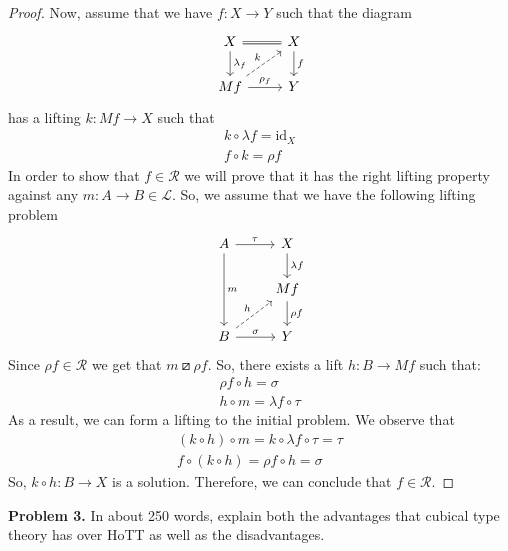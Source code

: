 \documentclass{article}
\theoremstyle{definition}
\newcommand{\comp}{\mathbin{\circ}}
\newcommand{\idarrow}[1][]{\mathrm{id}_{#1}}
\begin{document}
\begin{proof}
Now, assume that we have $f : X \to Y$
such that the diagram
\[
 \begin{tikzcd}
    X \ar[r,equal] \ar[d,"\lambda_f"] & X \ar[d,"f"] \\
    Mf \ar[r,"\rho_f"] \ar[ur, dashed, "k"] & Y
 \end{tikzcd}
\]
has a lifting $k : M f \to X$ such that
\begin{align*}
 k \comp \lambda f = \idarrow[X] \\
 f \comp k = \rho f
\end{align*}
In order to show that $f \in \mathcal{R}$
we will prove that it has the right lifting
property against any $m : A \to B \in \mathcal{L}$.
So, we assume that we have the following
lifting problem
\[
 \begin{tikzcd}
  A \ar[dd, "m"] \rar["\tau"] & X \dar["\lambda f"] \\
  & Mf \dar["\rho f"] \\
  B \rar["\sigma"] \ar[ur, dashed, "h"] & Y
 \end{tikzcd}
\]
Since $\rho f \in \mathcal{R}$ we get that
$m \boxslash \rho f$. So, there exists a lift
$h : B \to M f$ such that:
\begin{align*}
 \rho f \comp h = \sigma \\
 h \comp m = \lambda f \comp \tau
\end{align*}
As a result, we can form a lifting to the initial
problem. We observe that
\begin{align*}
 (k \comp h) \comp m = k \comp \lambda f \comp \tau = \tau \\
 f \comp (k \comp h) = \rho f \comp h = \sigma
\end{align*}
So, $k \comp h : B \to X$ is a solution.
Therefore, we can conclude that $f \in \mathcal{R}$.
\end{proof}


\newpage

\noindent\textbf{Problem 3.} In about 250 words, explain both the advantages that cubical type theory has over HoTT as well as the disadvantages.
\end{document}
